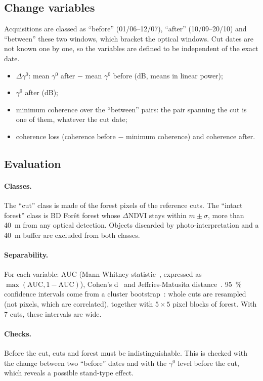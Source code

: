 \subsection{Change variables}

Acquisitions are classed as \enquote{before} (01/06--12/07), \enquote{after} (10/09--20/10) and \enquote{between}
these two windows, which bracket the optical windows. Cut dates are not known one by one, so the variables are
defined to be independent of the exact date.
\begin{itemize}
\item $\Delta\gamma^0$: mean $\gamma^0$ after $-$ mean $\gamma^0$ before (dB, means in linear power);
\item $\gamma^0$ after (dB);
\item minimum coherence over the \enquote{between} pairs: the pair spanning the cut is one of them, whatever the cut
  date;
\item coherence loss (coherence before $-$ minimum coherence) and coherence after.
\end{itemize}

\subsection{Evaluation}

\paragraph{Classes.} The \enquote{cut} class is made of the forest pixels of the reference cuts. The
\enquote{intact forest} class is BD Forêt forest whose $\Delta$NDVI stays within $m \pm \sigma$, more than 40~m
from any optical detection. Objects discarded by photo-interpretation and a 40~m buffer are excluded from both
classes.

\paragraph{Separability.} For each variable: AUC (Mann-Whitney statistic~\cite{hanley1982auc}, expressed as
$\max(\mathrm{AUC}, 1-\mathrm{AUC})$), Cohen's d~\cite{cohen1988power} and Jeffries-Matusita
distance~\cite{swain1978remote}. 95~\% confidence intervals come from a cluster bootstrap~\cite{kunsch1989bootstrap}:
whole cuts are resampled (not pixels, which are correlated), together with $5\times5$ pixel blocks of forest. With 7
cuts, these intervals are wide.

\paragraph{Checks.} Before the cut, cuts and forest must be indistinguishable. This is checked with the change
between two \enquote{before} dates and with the $\gamma^0$ level before the cut, which reveals a possible
stand-type effect.

